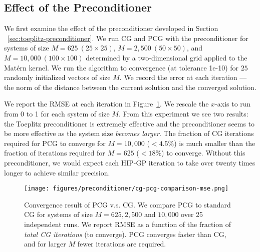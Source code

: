 \subsection{Effect of the Preconditioner}
\label{sec:experiments-preconditioner}
We first examine the effect of the preconditioner developed in Section
~\ref{sec:toeplitz-preconditioner}.
We run CG and PCG with the preconditioner for systems
of size $M=625~(25\times25)$, $M=2{,}500~ (50\times50)$, and $M=10{,}000~(100
\times 100)$ determined by a two-dimensional grid applied to the Mat\'ern
kernel.  We run the algorithm to convergence (at tolerance 1e-10) for $25$
randomly initialized vectors of size $M$.  We record the error at each
iteration --- the norm of the distance between the current solution and the
converged solution.

We report the RMSE at each iteration in Figure~\ref{fig:preconditioner}.
We rescale the $x$-axis to run from 0 to 1 for each system of size $M$.
From this experiment we see two results: the Toeplitz
preconditioner is extremely effective and the preconditioner seems to be more
effective as the system size \emph{becomes larger}.
The fraction of CG iterations required for PCG to converge for
$M=10{,}000$ ($<4.5\%$) is much smaller than the fraction of iterations
required for $M=625$ ($<18\%$) to converge.
Without this preconditioner, we would expect each HIP-GP iteration
to take over twenty times longer to achieve similar precision.

\begin{figure}[t!]
  \centering
  \texttt{[image: figures/preconditioner/cg-pcg-comparison-mse.png]}
  \caption{Convergence result of PCG v.s. CG.
	  We compare PCG to standard CG for systems of size $M=625, 2{,}500$
    and $10{},000$ over 25 independent runs.  We report RMSE as a
	  function of the fraction of \emph{total CG iterations} (to converge).
    PCG converges faster than CG, and for larger $M$ fewer
	  iterations are required.
	}
  \label{fig:preconditioner}
\end{figure}


